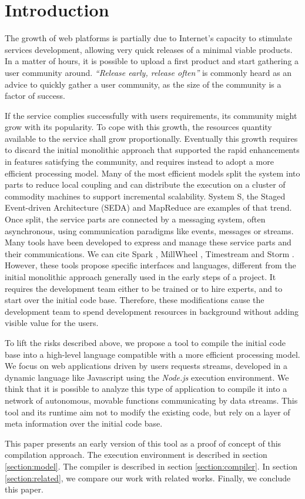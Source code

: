\section{Introduction}

The growth of web platforms is partially due to Internet's capacity to stimulate services development, allowing very quick releases of a minimal viable products.
In a matter of hours, it is possible to upload a first product and start gathering a user community around.
\textit{``Release early, release often''} is commonly heard as an advice to quickly gather a user community, as the size of the community is a factor of success.

If the service complies successfully with users requirements, its community might grow with its popularity.
To cope with this growth, the resources quantity available to the service shall grow proportionally.
Eventually this growth requires to discard the initial monolithic approach that supported the rapid enhancements in features satisfying the community, and requires instead to adopt a more efficient processing model.
Many of the most efficient models split the system into parts to reduce local coupling and can distribute the execution on a cluster of commodity machines\cite{Fox1997} to support incremental scalability.
System S\cite{Jain2006,Wu2007}, the Staged Event-driven Architecture (SEDA)\cite{Welsh2000} and MapReduce \cite{Dean2008} are examples of that trend.
Once split, the service parts are connected by a messaging system, often asynchronous, using communication paradigms like events, messages or streams.
Many tools have been developed to express and manage these service parts and their communications.
We can cite Spark \cite{Zaharia2010}, MillWheel \cite{Akidau2013}, Timestream \cite{Qian2013} and Storm \cite{Marz2011}.
However, these tools propose specific interfaces and languages, different from the initial monolithic approach generally used in the early steps of a project.
It requires the development team either to be trained or to hire experts, and to start over the initial code base.
Therefore, these modifications cause the development team to spend development resources in background without adding visible value for the users.

To lift the risks described above, we propose a tool to compile the initial code base into a high-level language compatible with a more efficient processing model.
We focus on web applications driven by users requests streams, developed in a dynamic language like Javascript using the \textit{Node.js} execution environment.
We think that it is possible to analyze this type of application to compile it into a network of autonomous, movable functions communicating by data streams.
This tool and its runtime aim not to modify the existing code, but rely on a layer of meta information over the initial code base.

This paper presents an early version of this tool as a proof of concept of this compilation approach.
The execution environment is described in section \ref{section:model}.
The compiler is described in section \ref{section:compiler}.
In section \ref{section:related}, we compare our work with related works.
Finally, we conclude this paper.